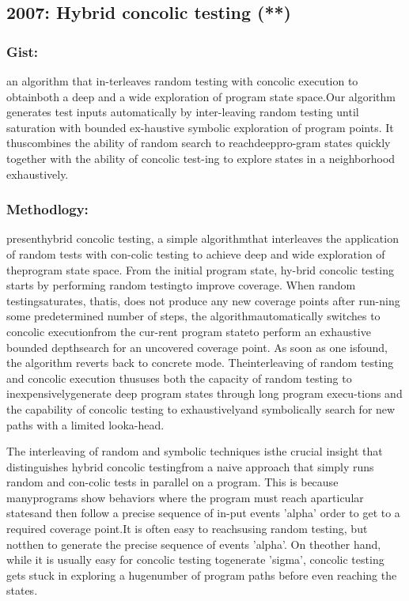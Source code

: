 \documentclass[	runningheads,
				a4paper]{llncs}
\begin{document}
\subsection{2007: Hybrid concolic testing (**)}

\subsubsection{Gist:}
an algorithm that in-terleaves random testing with concolic execution to obtainboth a deep and a wide exploration of program state space.Our algorithm generates test inputs automatically by inter-leaving  random  testing  until  saturation  with  bounded  ex-haustive  symbolic  exploration  of  program  points.   It  thuscombines the ability of random search to reachdeeppro-gram states quickly together with the ability of concolic test-ing to explore states in a neighborhood exhaustively. 

\subsubsection{Methodlogy:}
presenthybrid concolic testing, a simple algorithmthat  interleaves  the  application  of  random  tests  with  con-colic  testing  to  achieve  deep  and  wide  exploration  of  theprogram  state  space.   From  the  initial  program  state,  hy-brid  concolic  testing  starts  by  performing  random  testingto improve coverage.  When random testingsaturates, thatis,  does  not  produce  any  new  coverage  points  after  run-ning  some  predetermined  number  of  steps,  the  algorithmautomatically switches to concolic executionfrom the cur-rent program stateto perform an exhaustive bounded depthsearch for an uncovered coverage point.  As soon as one isfound,  the algorithm reverts back to concrete mode.   Theinterleaving of random testing and concolic execution thususes both the capacity of random testing to inexpensivelygenerate deep program states through long program execu-tions and the capability of concolic testing to exhaustivelyand symbolically search for new paths with a limited looka-head.

The interleaving of random and symbolic techniques isthe crucial insight that distinguishes hybrid concolic testingfrom a naive approach that simply runs random and con-colic tests in parallel on a program.  This is because manyprograms show behaviors where the program must reach aparticular statesand then follow a precise sequence of in-put events 'alpha' order to get to a required coverage point.It  is  often  easy  to  reachsusing  random  testing,  but  notthen to generate the precise sequence of events 'alpha'.  On theother hand, while it is usually easy for concolic testing togenerate 'sigma', concolic testing gets stuck in exploring a hugenumber of program paths before even reaching the states.
\end{document}
